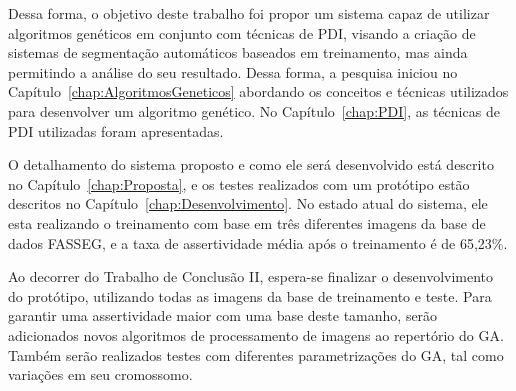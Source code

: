 \documentclass[12pt,oneside,a4paper,english,french,spanish,brazil,]{abntex2}
\begin{document}
Dessa forma, o objetivo deste trabalho foi propor um sistema capaz de utilizar algoritmos genéticos em conjunto com técnicas de PDI, visando a criação de sistemas de segmentação automáticos baseados em treinamento, mas ainda permitindo a análise do seu resultado. Dessa forma, a pesquisa iniciou no Capítulo~\ref{chap:AlgoritmosGeneticos} abordando os conceitos e técnicas utilizados para desenvolver um algoritmo genético. No Capítulo~\ref{chap:PDI}, as técnicas de PDI utilizadas foram apresentadas.

O detalhamento do sistema proposto e como ele será desenvolvido está descrito no Capítulo~\ref{chap:Proposta}, e os testes realizados com um protótipo estão descritos no Capítulo~\ref{chap:Desenvolvimento}. No estado atual do sistema, ele esta realizando o treinamento com base em três diferentes imagens da base de dados FASSEG, e a taxa de assertividade média após o treinamento é de 65,23\%.

Ao decorrer do Trabalho de Conclusão II, espera-se finalizar o desenvolvimento do protótipo, utilizando todas as imagens da base de treinamento e teste. Para garantir uma assertividade maior com uma base deste tamanho, serão adicionados novos algoritmos de processamento de imagens ao repertório do GA. Também serão realizados testes com diferentes parametrizações do GA, tal como variações em seu cromossomo.

\postextual






\printindex
\end{document}
